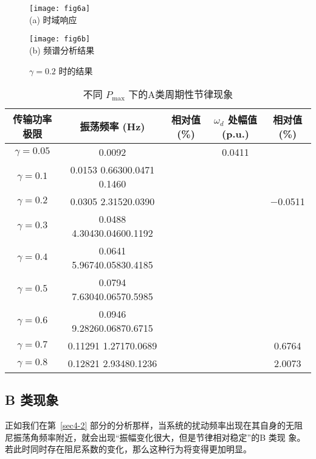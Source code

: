 \documentclass[withoutpreface,bwprint]{cumcmthesis} %
\begin{document}
\begin{figure}[h!t]
\begin{minipage}{0.48\linewidth}
  \centering
  {
  \texttt{[image: fig6a]}\\
  (a) 时域响应
  }
\end{minipage}\hfill
\begin{minipage}{0.48\linewidth}
  \centering
  {
  \texttt{[image: fig6b]}\\
  (b) 频谱分析结果
  }
\end{minipage}
    \caption{$\gamma=0.2$ 时的结果}
    \label{fig9}
    \end{figure}


\begin{table}[h!t]
    \center
    \caption{不同 $P_{\max}$ 下的A类周期性节律现象}
    \renewcommand\arraystretch{0.9}
    \begin{tabular}{c|c|c|c|c}
    \hline
    传输功率极限  & 振荡频率 (Hz) & 相对值 (\%) & $\omega_{d}$ 处幅值 (p.u.) &  相对值 (\%) \\
    \hline $\gamma=0.05$ & 0.0092 &  & 0.0411 & \\
    \hline $\gamma=0.1$ & 0.0153 0.66300.0471 0.1460 & & \\
    \hline $\gamma=0.2$ & 0.0305 2.31520.0390 & & & $-$0.0511 \\
    \hline $\gamma=0.3$ & 0.0488 4.30430.04600.1192 & & \\
    \hline $\gamma=0.4$ & 0.0641 5.96740.05830.4185 & & \\
    \hline $\gamma=0.5$ & 0.0794 7.63040.06570.5985 & & \\
    \hline $\gamma=0.6$ & 0.0946 9.28260.06870.6715 & & \\
    \hline $\gamma=0.7$ & 0.11291 1.27170.0689 & & & 0.6764 \\
    \hline $\gamma=0.8$ & 0.12821 2.93480.1236 & & & 2.0073 \\
        \hline
    \end{tabular}
     \label{tab2}
    \end{table}

\subsection{B 类现象}
\label{sec5-3}

正如我们在第~\ref{sec4-2} 部分的分析那样，当系统的扰动频率出现在其自身的无阻
尼振荡角频率附近，就会出现“振幅变化很大，但是节律相对稳定”的B 类现
象。若此时同时存在阻尼系数的变化，那么这种行为将变得更加明显。
\end{document}
